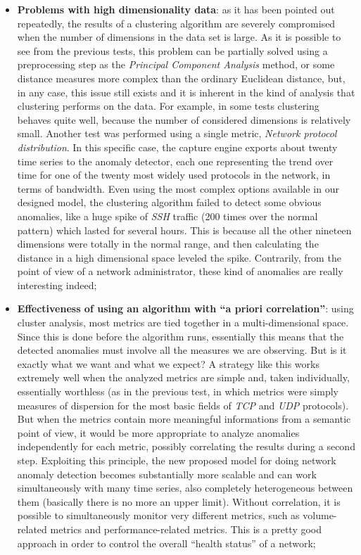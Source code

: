 \documentclass[12pt,a4paper,cucitura]{toptesi}
\begin{document}
\begin{itemize}
\item \textbf{Problems with high dimensionality data}: as it has been pointed out repeatedly, the results of a clustering algorithm are severely compromised when the number of dimensions in the data set is large. As it is possible to see from the previous tests, this problem can be partially solved using a preprocessing step as the \emph{Principal Component Analysis} method, or some distance measures more complex than the ordinary Euclidean distance, but, in any case, this issue still exists and it is inherent in the kind of analysis that clustering performs on the data.
For example, in some tests clustering behaves quite well, because the number of considered dimensions is relatively small. 
Another test was performed using a single metric, \emph{Network protocol distribution}. In this specific case, the capture engine exports about twenty time series to the anomaly detector, each one representing the trend over time for one of the twenty most widely used protocols in the network, in terms of bandwidth. Even using the most complex options available in our designed model, the clustering algorithm failed to detect some obvious anomalies, like a huge spike of \emph{SSH} traffic (200 times over the normal pattern) which lasted for several hours. This is because all the other nineteen dimensions were totally in the normal range, and then calculating the distance in a high dimensional space leveled the spike. Contrarily, from the point of view of a network administrator, these kind of anomalies are really interesting indeed;

\item \textbf{Effectiveness of using an algorithm with ``a priori correlation''}: using cluster analysis, most metrics are tied together in a multi-dimensional space. Since this is done before the algorithm runs, essentially this means that the detected anomalies must involve all the measures we are observing. But is it exactly what we want and what we expect? A strategy like this works extremely well when the analyzed metrics are simple and, taken individually, essentially worthless (as in the previous test, in which metrics were simply measures of dispersion for the most basic fields of \emph{TCP} and \emph{UDP} protocols). But when the metrics contain more meaningful informations from a semantic point of view, it would be more appropriate to analyze anomalies independently for each metric, possibly correlating the results during a second step. Exploiting this principle, the new proposed model for doing network anomaly detection becomes substantially more scalable and can work simultaneously with many time series, also completely heterogeneous between them (basically there is no more an upper limit). Without correlation, it is possible to simultaneously monitor very different metrics, such as volume-related metrics and performance-related metrics. This is a pretty good approach in order to control the overall ``health status'' of a network;


\end{itemize}
\end{document}
